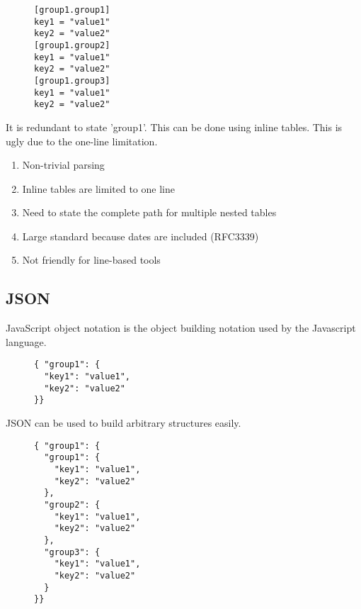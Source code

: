 \documentclass[listof=totoc]{article}
\begin{document}
\begin{figure}[H]
\centering
\begin{varwidth}{\linewidth}
\begin{verbatim}
[group1.group1]
key1 = "value1"
key2 = "value2"
[group1.group2]
key1 = "value1"
key2 = "value2"
[group1.group3]
key1 = "value1"
key2 = "value2"
\end{verbatim}
\end{varwidth}
\caption{}
\end{figure}

\noindent It is redundant to state 'group1'. This can be done using inline tables. This is ugly due to the one-line limitation.

\begin{enumerate}
  \item Non-trivial parsing
  \item Inline tables are limited to one line
  \item Need to state the complete path for multiple nested tables
  \item Large standard because dates are included (RFC3339)
  \item Not friendly for line-based tools
\end{enumerate}

\subsection{JSON}
\noindent JavaScript object notation is the object building notation used by the Javascript language.


\begin{figure}[H]
\centering
\begin{varwidth}{\linewidth}
\begin{verbatim}
{ "group1": {
  "key1": "value1",
  "key2": "value2"
}}
\end{verbatim}
\end{varwidth}
\caption{}
\end{figure}

\noindent JSON can be used to build arbitrary structures easily.


\begin{figure}[H]
\centering
\begin{varwidth}{\linewidth}
\begin{verbatim}
{ "group1": {
  "group1": {
    "key1": "value1",
    "key2": "value2"
  },
  "group2": {
    "key1": "value1",
    "key2": "value2"
  },
  "group3": {
    "key1": "value1",
    "key2": "value2"
  }
}}
\end{verbatim}
\end{varwidth}
\caption{}
\end{figure}
\end{document}
